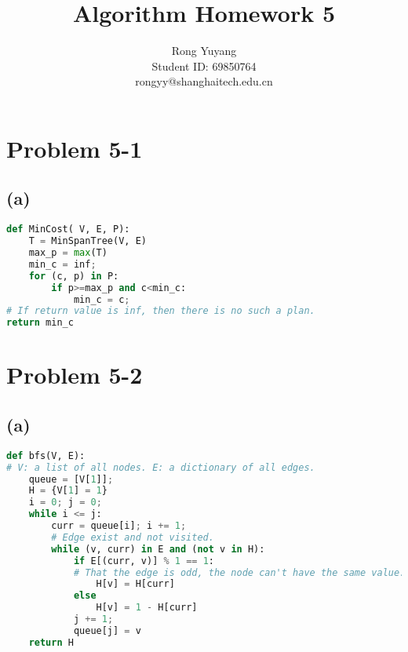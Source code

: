 \documentclass{article}
\title{Algorithm Homework 5}
\author{Rong Yuyang \\ Student ID: 69850764 \\ rongyy@shanghaitech.edu.cn}
\begin{document}
\maketitle

\section*{Problem 5-1}
\subsection*{(a)}
\begin{lstlisting}[language = python]
def MinCost( V, E, P):
	T = MinSpanTree(V, E)
	max_p = max(T)
	min_c = inf;
	for (c, p) in P:
		if p>=max_p and c<min_c:
			min_c = c;
# If return value is inf, then there is no such a plan.
return min_c
\end{lstlisting}
\section*{Problem 5-2}
\subsection*{(a)}
\begin{lstlisting}[language = python]
def bfs(V, E):
# V: a list of all nodes. E: a dictionary of all edges.
    queue = [V[1]];
    H = {V[1] = 1}
    i = 0; j = 0;
    while i <= j:
        curr = queue[i]; i += 1;
        # Edge exist and not visited.
        while (v, curr) in E and (not v in H):
            if E[(curr, v)] % 1 == 1:
            # That the edge is odd, the node can't have the same value.
                H[v] = H[curr]
            else
                H[v] = 1 - H[curr]
            j += 1;
            queue[j] = v
    return H
\end{lstlisting}
\end{document}
